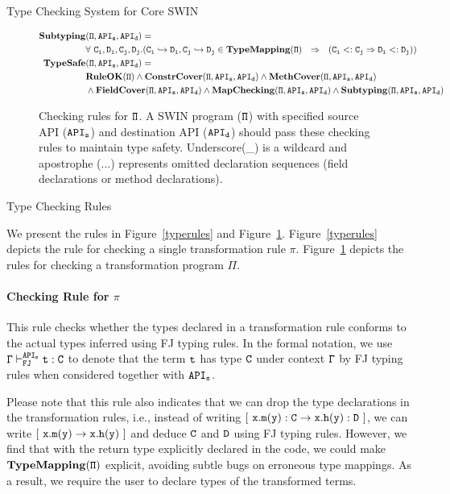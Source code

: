 \begin{section}{Type Checking System for Core SWIN}
\begin{figure*}
\begin{align*}
\tt \mathbf{Subtyping}&\tt(\Pi, API_s, API_d) = \\
                      &\tt\forall~C_i,D_i,C_j,D_j.( C_i\hookrightarrow D_i, C_j\hookrightarrow D_j \in \mathbf{TypeMapping}(\Pi) ~~\Rightarrow~~ (C_i <: C_j\Rightarrow D_i<:D_j))\\
\tt \mathbf{TypeSafe} &\tt(\Pi, API_s, API_d) = \\
                      &\tt \mathbf{RuleOK}(\Pi) \land \mathbf{ConstrCover}(\Pi, API_s, API_d) \land \mathbf{MethCover}(\Pi, API_s, API_d)\\
                      &\tt \land \mathbf{FieldCover}(\Pi, API_s, API_d) \land \mathbf{MapChecking}(\Pi, API_s, API_d) \land \mathbf{Subtyping}(\Pi, API_s, API_d)
\end{align*}
\caption{Checking rules for $\tt\Pi$. A SWIN program ($\tt\Pi$) with specified source API ($\tt API_s$) and destination API ($\tt API_d$) should pass these checking rules to maintain type safety. Underscore(\_) is a wildcard and apostrophe (...) represents omitted declaration sequences (field declarations or method declarations). }
\label{logicrules}
\end{figure*}

\begin{subsection}{Type Checking Rules}

  We present the rules in Figure~\ref{typerules} and
  Figure~\ref{logicrules}. Figure~\ref{typerules} depicts the rule
  for checking a single transformation rule $\pi$.
  Figure~\ref{logicrules} depicts the rules for checking a
  transformation program $\Pi$.

  \paragraph{Checking Rule for $\pi$} This rule checks whether the
  types declared in a transformation rule conforms to the actual types
  inferred using FJ typing rules. In the formal notation, we use
  $\tt\Gamma\vdash^{API_s}_{FJ}t:C$ to denote that the term $\tt t$ has type $\tt C$
  under context $\tt\Gamma$ by FJ typing rules when considered together with
  $\tt API_s$.

  Please note that this rule also indicates that we can drop the type
  declarations in the transformation rules, i.e., instead of
  writing $\tt [\ x.m(y):C \rightarrow x.h(y):D\ ]$, we can write $\tt[\
  x.m(y) \rightarrow x.h(y)\ ]$ and deduce $\tt C$ and $\tt D$ using FJ typing
  rules. However, we find that with the return type explicitly declared in the code,
  we could make $\tt \mathbf{TypeMapping}(\Pi)$ explicit, avoiding subtle bugs
  on erroneous type mappings. As a result, we require the user to
  declare types of the transformed terms. 


\end{subsection}
\end{section}
